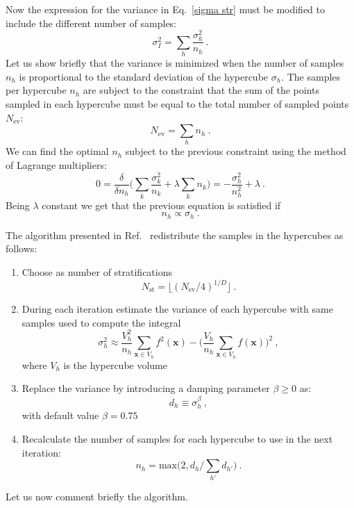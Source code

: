 \documentclass[../main/main.tex]{subfiles}
\begin{document}
Now the expression for the variance in Eq.~\ref{sigma str} must be modified to include the different number of samples:
\begin{equation}
		\sigma^2_I = \sum_h  \frac{\sigma^2_h}{n_h} \ .
\end{equation}
Let us show briefly that the variance is minimized when the number of samples $n_h$ is proportional to the standard deviation of the hypercube 
$\sigma_h$.
The samples per hypercube $n_h$ are subject to the constraint that the sum of the points sampled in each hypercube  must be equal to the total number of sampled
points $N_\text{ev}$:
\begin{equation}
	N_\text{ev} = \sum_h n_h \ .
\end{equation}
We can find the optimal $n_h$ subject to the previous constraint using the method of Lagrange multipliers:
\begin{equation}
	0 = \frac{\delta}{\delta n_h} \bigg( \sum_k \frac{\sigma^2_k}{n_k} + \lambda \sum_k n_k\bigg) =  - \frac{\sigma^2_h}{n^2_h} + \lambda \ .
\end{equation}
Being $\lambda$ constant we get that the previous equation is satisfied if
\begin{equation}
	n_h \propto \sigma_h \ .
\end{equation}

The algorithm presented in Ref.~\cite{Lepage:2020tgj} redistribute the samples in the hypercubes as follows:

\begin{enumerate}
	\item Choose as number of stratifications
	\begin{equation}
		\label{nstrat}
		N_\text{st} = \lfloor (N_\text{ev}/4)^{1/D}\rfloor  \ .
	\end{equation}
\item 
During each iteration estimate the variance of each hypercube with same samples used to compute the integral
\begin{equation}
	\sigma^2_h \approx \frac{V_h^2}{n_h} \sum_{\textbf{x} \in V_h} f^2(\textbf{x}) - \bigg( \frac{V_h}{n_h} \sum_{\textbf{x} \in V_h} f(\textbf{x})\bigg)^2 \ ,
\end{equation}
where $V_h$ is the hypercube volume
\item Replace the variance by introducing a damping parameter $\beta \ge 0$ as:
\begin{equation}
	d_h \equiv \sigma_h^\beta \ ,
\end{equation}
with default value $\beta = 0.75$
\item 
Recalculate the number of samples for each hypercube to use in the next iteration:
\begin{equation}
	n_h = \text{max} \big(2, d_h / \sum_{h'} d_{h'}\big) \ .
\end{equation}
\end{enumerate}
Let us now comment briefly the algorithm.
\end{document}
